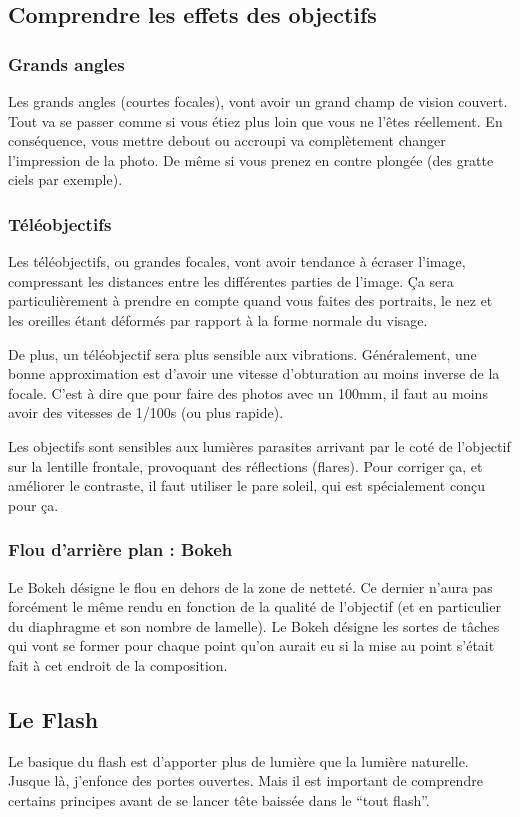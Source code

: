 \documentclass[a4paper,twoside]{article}
\begin{document}
\subsection{Comprendre les effets des objectifs}
\subsubsection{Grands angles}
Les grands angles (courtes focales), vont avoir un grand champ de vision couvert. Tout va se passer comme si vous étiez plus loin que vous ne l'êtes réellement. En conséquence, vous mettre debout ou accroupi va complètement changer l'impression de la photo. De même si vous prenez en contre plongée (des gratte ciels par exemple).

\subsubsection{Téléobjectifs}
Les téléobjectifs, ou grandes focales, vont avoir tendance à écraser l'image, compressant les distances entre les différentes parties de l'image. Ça sera particulièrement à prendre en compte quand vous faites des portraits, le nez et les oreilles étant déformés par rapport à la forme normale du visage. 

De plus, un téléobjectif sera plus sensible aux vibrations. Généralement, une bonne approximation est d'avoir une vitesse d'obturation au moins inverse de la focale. C'est à dire que pour faire des photos avec un 100mm, il faut au moins avoir des vitesses de 1/100s (ou plus rapide).

Les objectifs sont sensibles aux lumières parasites arrivant par le coté de l'objectif sur la lentille frontale, provoquant des réflections (flares). Pour corriger ça, et améliorer le contraste, il faut utiliser le pare soleil, qui est spécialement conçu pour ça.

\subsubsection{Flou d'arrière plan : Bokeh}
Le Bokeh désigne le flou en dehors de la zone de netteté. Ce dernier n'aura pas forcément le même rendu en fonction de la qualité de l'objectif (et en particulier du diaphragme et son nombre de lamelle). Le Bokeh désigne les sortes de tâches qui vont se former pour chaque point qu'on aurait eu si la mise au point s'était fait à cet endroit de la composition. 

\subsection{Le Flash}
Le basique du flash est d'apporter plus de lumière que la lumière naturelle. Jusque là, j'enfonce des portes ouvertes. Mais il est important de comprendre certains principes avant de se lancer tête baissée dans le ``tout flash''. 
\end{document}
